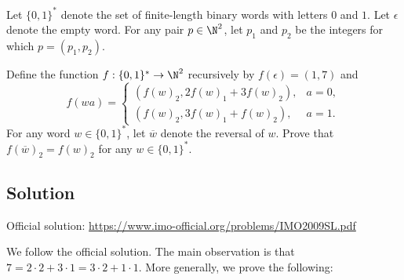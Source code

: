 Let $\{0, 1\}^*$ denote the set of finite-length binary words with letters $0$ and $1$.
Let $\epsilon$ denote the empty word.
For any pair $p \in \N^2$, let $p_1$ and $p_2$ be the integers for which $p = (p_1, p_2)$.

Define the function $f : \{0, 1\}^* \to \N^2$ recursively by $f(\epsilon) = (1, 7)$ and
\[ f(wa) = \begin{cases} (f(w)_2, 2 f(w)_1 + 3 f(w)_2), & a = 0, \\ (f(w)_2, 3 f(w)_1 + f(w)_2), & a = 1. \end{cases} \]
For any word $w \in \{0, 1\}^*$, let $\overline{w}$ denote the reversal of $w$.
Prove that $f(\overline{w})_2 = f(w)_2$ for any $w \in \{0, 1\}^*$.



\subsection*{Solution}

Official solution: \url{https://www.imo-official.org/problems/IMO2009SL.pdf}

We follow the official solution.
The main observation is that $7 = 2 \cdot 2 + 3 \cdot 1 = 3 \cdot 2 + 1 \cdot 1$.
More generally, we prove the following:

